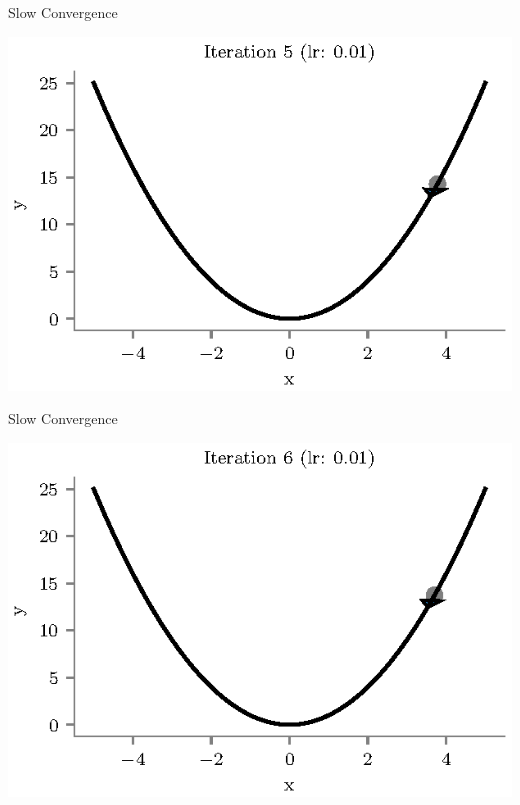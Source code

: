 \documentclass{beamer}
\begin{document}
\begin{frame}{Slow Convergence}
\begin{center}
\includegraphics[totalheight=6cm]{gradient-descent/undershooting-5.eps}
\end{center}
\end{frame}

\begin{frame}{Slow Convergence}
\begin{center}
\includegraphics[totalheight=6cm]{gradient-descent/undershooting-6.eps}
\end{center}
\end{frame}
\end{document}
